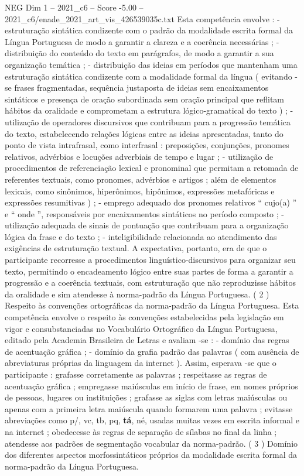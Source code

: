 \begin{textsample}{NEG Dim 1 – 2021\_c6 – Score -5.00 – 2021\_c6/enade\_2021\_art\_vis\_426539035c.txt}
Esta competência envolve : - estruturação sintática condizente com o padrão da modalidade escrita formal da Língua Portuguesa de modo a garantir a clareza e a coerência necessárias ; - distribuição do conteúdo do texto em parágrafos, de modo a garantir a sua organização temática ; - distribuição das ideias em períodos que mantenham uma estruturação sintática condizente com a modalidade formal da língua ( evitando -se frases fragmentadas, sequência justaposta de ideias sem encaixamentos sintáticos e presença de oração subordinada sem oração principal que reflitam hábitos da oralidade e comprometam a estrutura lógico-gramatical do texto ) ; - utilização de operadores discursivos que contribuam para a progressão temática do texto, estabelecendo relações lógicas entre as ideias apresentadas, tanto do ponto de vista intrafrasal, como interfrasal : preposições, conjunções, pronomes relativos, advérbios e locuções adverbiais de tempo e lugar ; - utilização de procedimentos de referenciação lexical e pronominal que permitam a retomada de referentes textuais, como pronomes, advérbios e artigos ; além de elementos lexicais, como sinônimos, hiperônimos, hipônimos, expressões metafóricas e expressões resumitivas ) ; - emprego adequado dos pronomes relativos “ cujo(a) ” e “ onde ”, responsáveis por encaixamentos sintáticos no período composto ; - utilização adequada de sinais de pontuação que contribuam para a organização lógica da frase e do texto ; - inteligibilidade relacionada ao atendimento das exigências de estruturação textual.
A expectativa, portanto, era de que o participante recorresse a procedimentos linguístico-discursivos para organizar seu texto, permitindo o encadeamento lógico entre suas partes de forma a garantir a progressão e a coerência textuais, com estruturação que não reproduzisse hábitos da oralidade e sim atendesse à norma-padrão da Língua Portuguesa. ( 2 ) Respeito às convenções ortográficas da norma-padrão da Língua Portuguesa.
Esta competência envolve o respeito às convenções estabelecidas pela legislação em vigor e consubstanciadas no Vocabulário Ortográfico da Língua Portuguesa, editado pela Academia Brasileira de Letras e avaliam -se : - domínio das regras de acentuação gráfica ; - domínio da grafia padrão das palavras ( com ausência de abreviaturas próprias da linguagem da internet ).
Assim, esperava -se que o participante : grafasse corretamente as palavras ; respeitasse as regras de acentuação gráfica ; empregasse maiúsculas em início de frase, em nomes próprios de pessoas, lugares ou instituições ; grafasse as siglas com letras maiúsculas ou apenas com a primeira letra maiúscula quando formarem uma palavra ; evitasse abreviações como p/, vc, tb, pq, \textbf{tá}, né, usadas muitas vezes em escrita informal e na internet ; obedecesse às regras de separação de sílabas no final da linha ; atendesse aos padrões de segmentação vocabular da norma-padrão. ( 3 ) Domínio dos diferentes aspectos morfossintáticos próprios da modalidade escrita formal da norma-padrão da Língua Portuguesa.

\end{textsample}

